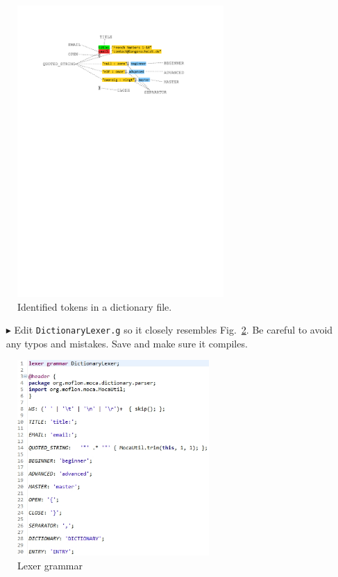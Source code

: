 \begin{figure}[!htbp]
\begin{center}
 \includegraphics[width=0.7\textwidth]{pics/moca/2TextToMocaTree/4-tokens}
  \caption{Identified tokens in a dictionary file.}
  \label{fig:moca-4-Tokens}
\end{center}
\end{figure}

\begin{enumerate}
\item[$\blacktriangleright$] Edit \texttt{DictionaryLexer.g} so it closely resembles Fig.~\ref{fig:moca-6-lexer}.
Be careful to avoid any typos and mistakes.  Save and make sure it compiles.  
\end{enumerate}

\begin{figure}[!htbp]
\begin{center}
 \includegraphics[width=0.65\textwidth]{pics/moca/2TextToMocaTree/6-lexer}
  \caption{Lexer grammar}
  \label{fig:moca-6-lexer}
\end{center}
\end{figure}

